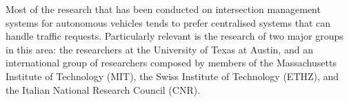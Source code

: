 Most of the research that has been conducted on intersection management systems for autonomous vehicles tends to prefer centralised systems that can handle traffic requests.
Particularly relevant is the research of two major groups in this area: the researchers at the University of Texas at Austin, and an international group of researchers composed by members of the Massachusetts Institute of Technology (MIT), the Swiss Institute of Technology (ETHZ), and the Italian National Research Council (CNR).
